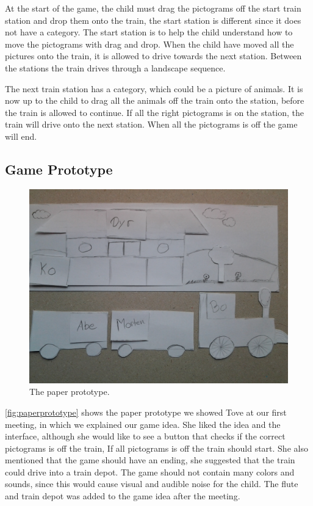At the start of the game, the child must drag the pictograms off the start train station and drop them onto the train, the start station is different since it does not have a category. The start station is to help the child understand how to move the pictograms with drag and drop. When the child have moved all the pictures onto the train, it is allowed to drive towards the next station. Between the stations the train drives through a landscape sequence.

The next train station has a category, which could be a picture of animals. It is now up to the child to drag all the animals off the train onto the station, before the train is allowed to continue. If all the right pictograms is on the station, the train will drive onto the next station. When all the pictograms is off the game will end.

\subsection{Game Prototype}
\begin{figure}[H]
\centering
\includegraphics[width=0.9\linewidth]{img/screenshots/prototype1.jpg}%
\caption{The paper prototype.}
\label{fig:paperprototype}
\end{figure}
\autoref{fig:paperprototype} shows the paper prototype we showed Tove at our first meeting, in which we explained our game idea. She liked the idea and the interface, although she would like to see a button that checks if the correct pictograms is off the train, If all pictograms is off the train should start. She also mentioned that the game should have an ending, she suggested that the train could drive into a train depot. The game should not contain many colors and sounds, since this would cause visual and audible noise for the child. The flute and train depot was added to the game idea after the meeting.


